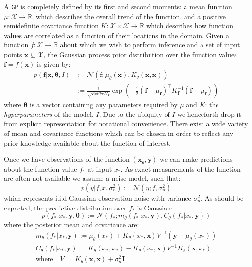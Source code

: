 \documentclass{article}
\newcommand{\xd}{\mathbf{x}}
\newcommand{\yd}{\mathbf{y}}
\begin{document}
A \verb"GP" is completely defined by its first and second moments: a mean function $\mu : \mathcal{X} \rightarrow \mathbb{R}$, which describes the overall trend of the function, and a positive semidefinite covariance function $K : \mathcal{X} \times \mathcal{X} \rightarrow \mathbb{R}$ which describes how function values are correlated as a function of their locations in the domain. Given a function $f : \mathcal{X} \rightarrow \mathbb{R}$ about which we wish to perform inference and a set of input points $\mathbf{x} \subseteq \mathcal{X}$, the Gaussian process prior distribution over the function values $\mathbf{f} = f(\mathbf{x})$ is given by:
\begin{align}
p(\mathbf{f} | \mathbf{x},\bm{\theta},I) &:= \mathcal{N}\left( \mathbf{f};\mu_\theta(\mathbf{x}),K_\theta(\mathbf{x},\mathbf{x}) \right) \\
&:= \frac{1}{\sqrt{\mathrm{det} 2 \pi K_{\mathbf{f}}} } \exp \left( - \frac{1}{2} (\mathbf{f}-\mu_{\mathbf{f}})^\top K_\mathbf{f}^{-1} (\mathbf{f}-\mu_{\mathbf{f}})  \right)
\end{align}
where $\bm{\theta}$ is a vector containing any parameters required by $\mu$ and $K$: the \emph{hyperparameters} of the model, $I$. Due to the ubiquity of $I$ we henceforth drop it from explicit representation for notational convenience. %
There exist a wide variety of mean and covariance functions which can be chosen in order to reflect any prior knowledge available about the function of interest. 

Once we have observations of the function $(\mathbf{x_s},\yd)$ we can make predictions about the function value $f_*$ at input $x_*$. As exact measurements of the function are often not available we assume a noise model, such that:
\begin{equation}\label{obsnoise}
p(y | f, x, \sigma_n^2) := \mathcal{N}(y; f, \sigma_n^2)
\end{equation} 
which represents i.i.d Gaussian observation noise with variance $\sigma_n^2$. As should be expected, the predictive distribution over $f_*$ is Gaussian:
\begin{equation}\label{posteriorpred}
p(f_* | x_*, \yd,\bm{\theta}) := \mathcal{N} ( f_* ; m_\theta(f_* | x_*, \yd), C_\theta(f_* | x_*, \yd))
\end{equation}
where the posterior mean and covariance are:
\begin{align}
m_\theta(f_* | x_*, \yd) := \mu_\theta(x_*) + K_\theta(x_*,\xd)V^{-1}(\yd - \mu_\theta(x_*))\\
C_\theta(f_* | x_*, \yd) := K_\theta(x_*,x_*) - K_\theta(x_*,\xd)V^{-1}K_\theta(\xd,x_*)\\
\mathrm{where}\quad V := K_\theta(\xd,\xd) + \sigma_n^2\mathbf{I}
\end{align}
\end{document}
